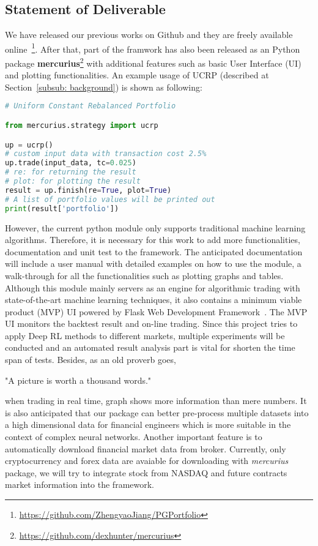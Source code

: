\subsection{Statement of Deliverable}

We have released our previous works on Github and they are freely available online~\footnote{\url{https://github.com/ZhengyaoJiang/PGPortfolio}}. After that, part of the framwork has also been released as an Python package \textbf{mercurius}\footnote{\url{https://github.com/dexhunter/mercurius}} with additional features such as basic User Interface (UI) and plotting functionalities. An example usage of UCRP (described at Section~\ref{subsub: background}) is shown as following:

\begin{lstlisting}[language=Python, caption=Example Usage of Mercurius]
# Uniform Constant Rebalanced Portfolio

from mercurius.strategy import ucrp

up = ucrp()
# custom input data with transaction cost 2.5%
up.trade(input_data, tc=0.025) 
# re: for returning the result
# plot: for plotting the result
result = up.finish(re=True, plot=True)
# A list of portfolio values will be printed out
print(result['portfolio'])
\end{lstlisting}

However, the current python module only supports traditional machine learning algorithms. Therefore, it is necessary for this work to add more functionalities, documentation and unit test to the framework. The anticipated documentation will include a user manual with detailed examples on how to use the module, a walk-through for all the functionalities such as plotting graphs and tables. Although this module mainly servers as an engine for algorithmic trading with state-of-the-art machine learning techniques, it also contains a minimum viable product (MVP) UI powered by Flask Web Development Framework~\cite{Grinberg:2014:FWD:2621997}. The MVP UI monitors the backtest result and on-line trading. Since this project tries to apply Deep RL methods to different markets, multiple experiments will be conducted and an automated result analysis part is vital for shorten the time span of tests. Besides, as an old proverb goes,
\begin{displayquote}
"A picture is worth a thousand words."
\end{displayquote}
when trading in real time, graph shows more information than mere numbers. It is also anticipated that our package can better pre-process multiple datasets into a high dimensional data for financial engineers which is more suitable in the context of complex neural networks. Another important feature is to automatically download financial market data from broker. Currently, only cryptocurrency and forex data are avaiable for downloading with \textit{mercurius} package, we will try to integrate stock from NASDAQ and future contracts market information into the framework.

